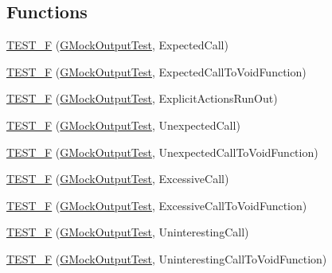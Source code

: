 \subsection*{Functions}
\begin{DoxyCompactItemize}
\item 
\mbox{\hyperlink{googletest-master_2googlemock_2test_2gmock__output__test___8cc_a5cae7729bb06b3064b765a06e58c2566}{T\+E\+S\+T\+\_\+F}} (\mbox{\hyperlink{class_g_mock_output_test}{G\+Mock\+Output\+Test}}, Expected\+Call)
\item 
\mbox{\hyperlink{googletest-master_2googlemock_2test_2gmock__output__test___8cc_acafecaf97c5e08925e452e670cc9c60c}{T\+E\+S\+T\+\_\+F}} (\mbox{\hyperlink{class_g_mock_output_test}{G\+Mock\+Output\+Test}}, Expected\+Call\+To\+Void\+Function)
\item 
\mbox{\hyperlink{googletest-master_2googlemock_2test_2gmock__output__test___8cc_a9ea40a88b30f8b5507efbf486ac06761}{T\+E\+S\+T\+\_\+F}} (\mbox{\hyperlink{class_g_mock_output_test}{G\+Mock\+Output\+Test}}, Explicit\+Actions\+Run\+Out)
\item 
\mbox{\hyperlink{googletest-master_2googlemock_2test_2gmock__output__test___8cc_a87e290b73a27f69e2352986b95a09fcb}{T\+E\+S\+T\+\_\+F}} (\mbox{\hyperlink{class_g_mock_output_test}{G\+Mock\+Output\+Test}}, Unexpected\+Call)
\item 
\mbox{\hyperlink{googletest-master_2googlemock_2test_2gmock__output__test___8cc_aba5c783b0346beacc83af5ced4aeb7db}{T\+E\+S\+T\+\_\+F}} (\mbox{\hyperlink{class_g_mock_output_test}{G\+Mock\+Output\+Test}}, Unexpected\+Call\+To\+Void\+Function)
\item 
\mbox{\hyperlink{googletest-master_2googlemock_2test_2gmock__output__test___8cc_afa4ca5a73e2af24d016e48ee70e10901}{T\+E\+S\+T\+\_\+F}} (\mbox{\hyperlink{class_g_mock_output_test}{G\+Mock\+Output\+Test}}, Excessive\+Call)
\item 
\mbox{\hyperlink{googletest-master_2googlemock_2test_2gmock__output__test___8cc_ad8406b814788092ad25da61038706134}{T\+E\+S\+T\+\_\+F}} (\mbox{\hyperlink{class_g_mock_output_test}{G\+Mock\+Output\+Test}}, Excessive\+Call\+To\+Void\+Function)
\item 
\mbox{\hyperlink{googletest-master_2googlemock_2test_2gmock__output__test___8cc_aa9159573c3f5f5bc7be3475e7398afc5}{T\+E\+S\+T\+\_\+F}} (\mbox{\hyperlink{class_g_mock_output_test}{G\+Mock\+Output\+Test}}, Uninteresting\+Call)
\item 
\mbox{\hyperlink{googletest-master_2googlemock_2test_2gmock__output__test___8cc_ad6bc4a5b1d635a65363653eff36f6f0c}{T\+E\+S\+T\+\_\+F}} (\mbox{\hyperlink{class_g_mock_output_test}{G\+Mock\+Output\+Test}}, Uninteresting\+Call\+To\+Void\+Function)

\end{DoxyCompactItemize}

